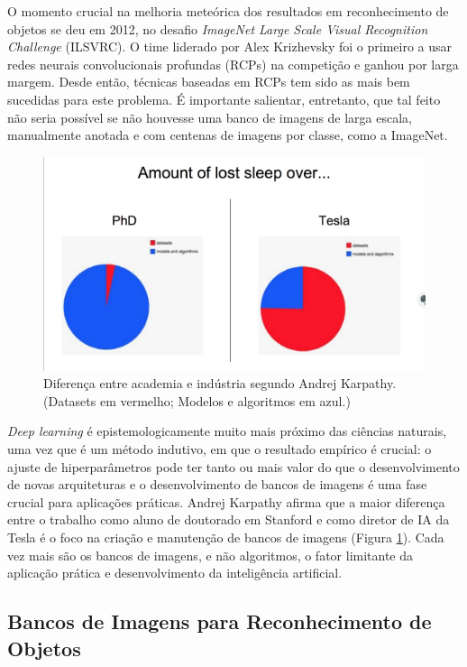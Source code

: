 \documentclass[conference]{IEEEtran}
\begin{document}
O momento crucial na melhoria meteórica dos resultados em reconhecimento de objetos se deu em 2012, no desafio \textit{ImageNet Large Scale Visual Recognition Challenge}  (ILSVRC)\cite{goodfellow}. O time liderado por Alex Krizhevsky foi o primeiro a usar redes neurais convolucionais profundas (RCPs) na competição e ganhou por larga margem\cite{alexnet}. Desde então, técnicas baseadas em RCPs tem sido as mais bem sucedidas para este problema. É importante salientar, entretanto, que tal feito não seria possível se não houvesse uma banco de imagens de larga escala, manualmente anotada e com centenas de imagens por classe, como a ImageNet.
\begin{figure}[ht!]
\begin{center}
\includegraphics[width=.7\columnwidth]{slide-karpathy.png}
\caption{Diferença entre academia e indústria segundo Andrej Karpathy\cite{karpathy}. (\small{Datasets em vermelho; Modelos e algoritmos em azul.})}\label{slide-karpathy}
\end{center}
\end{figure}
\textit{Deep learning} é epistemologicamente muito mais próximo das ciências naturais, uma vez que é um método indutivo, em que o resultado empírico é crucial: o ajuste de hiperparâmetros pode ter tanto ou mais valor do que o desenvolvimento de novas arquiteturas e o desenvolvimento de bancos de imagens é uma fase crucial para aplicações práticas. Andrej Karpathy\cite{karpathy} afirma que a maior diferença entre o trabalho como aluno de doutorado em Stanford e como diretor de IA da Tesla é o foco na criação e manutenção de bancos de imagens (Figura \ref{slide-karpathy}). Cada vez mais são os bancos de imagens, e não algoritmos, o fator limitante da aplicação prática e desenvolvimento da inteligência artificial. 

\subsection{Bancos de Imagens para Reconhecimento de Objetos}
\end{document}
